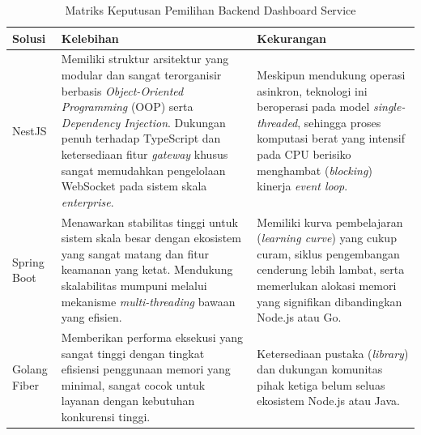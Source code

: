 \begin{table}[htbp]
    \centering
    \caption{Matriks Keputusan Pemilihan Backend Dashboard Service}
    \label{tab:matriks_backend}
    \begin{tabularx}{\textwidth}{|l|X|X|}
        \hline
        \textbf{Solusi} & \textbf{Kelebihan} & \textbf{Kekurangan} \\
        \hline
        NestJS & Memiliki struktur arsitektur yang modular dan sangat terorganisir berbasis \textit{Object-Oriented Programming} (OOP) serta \textit{Dependency Injection}. Dukungan penuh terhadap TypeScript dan ketersediaan fitur \textit{gateway} khusus sangat memudahkan pengelolaan WebSocket pada sistem skala \textit{enterprise}. & Meskipun mendukung operasi asinkron, teknologi ini beroperasi pada model \textit{single-threaded}, sehingga proses komputasi berat yang intensif pada CPU berisiko menghambat (\textit{blocking}) kinerja \textit{event loop}. \\
        \hline
        Spring Boot & Menawarkan stabilitas tinggi untuk sistem skala besar dengan ekosistem yang sangat matang dan fitur keamanan yang ketat. Mendukung skalabilitas mumpuni melalui mekanisme \textit{multi-threading} bawaan yang efisien. & Memiliki kurva pembelajaran (\textit{learning curve}) yang cukup curam, siklus pengembangan cenderung lebih lambat, serta memerlukan alokasi memori yang signifikan dibandingkan Node.js atau Go. \\
        \hline
        Golang Fiber & Memberikan performa eksekusi yang sangat tinggi dengan tingkat efisiensi penggunaan memori yang minimal, sangat cocok untuk layanan dengan kebutuhan konkurensi tinggi. & Ketersediaan pustaka (\textit{library}) dan dukungan komunitas pihak ketiga belum seluas ekosistem Node.js atau Java. \\
        \hline
    \end{tabularx}
\end{table}